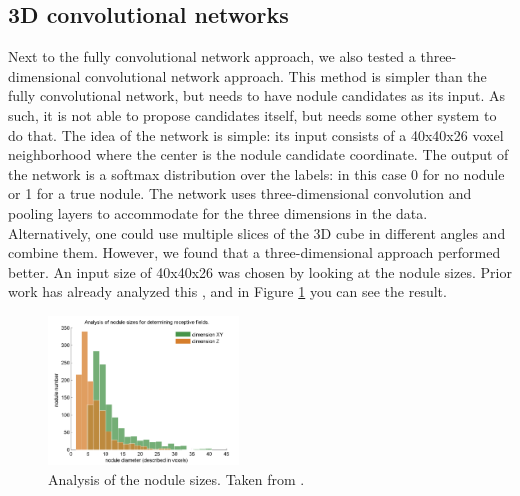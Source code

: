 \documentclass{article}
\begin{document}
\subsection{3D convolutional networks}
Next to the fully convolutional network approach, we also tested a three-dimensional convolutional network approach.
This method is simpler than the fully convolutional network, but needs to have nodule candidates as its input.
As such, it is not able to propose candidates itself, but needs some other system to do that.
The idea of the network is simple: its input consists of a 40x40x26 voxel neighborhood where the center is the nodule candidate coordinate.
The output of the network is a softmax distribution over the labels: in this case 0 for no nodule or 1 for a true nodule.
The network uses three-dimensional convolution and pooling layers to accommodate for the three dimensions in the data.
Alternatively, one could use multiple slices of the 3D cube in different angles and combine them.
However, we found that a three-dimensional approach performed better.
An input size of 40x40x26 was chosen by looking at the nodule sizes.
Prior work has already analyzed this \cite{qidou}, and in Figure \ref{fig:nodulesizes} you can see the result.

\begin{figure}[tb]
	\centering
	\includegraphics[width=0.45\textwidth]{nodulesizes.png}
	\caption{Analysis of the nodule sizes. Taken from \cite{qidou}.}
	\label{fig:nodulesizes}
\end{figure}
\end{document}

